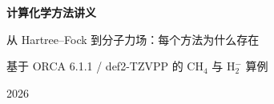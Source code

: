 \documentclass[UTF8,11pt,a4paper,fontset=fandol]{ctexart}
\begin{document}
\begin{titlepage}
  \thispagestyle{empty}
  \centering
  \vspace*{0.22\textheight}
  {\Huge\bfseries 计算化学方法讲义\par}
  \vspace{1.4em}
  {\Large 从 Hartree--Fock 到分子力场：每个方法为什么存在\par}
  \vspace{2.2em}
  {\large 基于 ORCA 6.1.1 / def2-TZVPP 的 CH$_4$ 与 H$_2^-$ 算例\par}
  \vfill
  {\large 2026\par}
\end{titlepage}

\tableofcontents
\clearpage


















\appendix
{}







\nocite{szabo1996}
\end{document}
